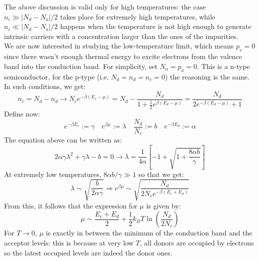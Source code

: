 \documentclass[10.75pt,a4paper,openright,bottom=2cm]{article}
\begin{document}
The above discussion is valid only for high temperatures: the case $n_i\gg|N_d-N_a|/2$ takes place for extremely high temperatures, while $n_i\ll|N_d-N_a|/2$ happens when the temperature is not high enough to generate intrinsic carriers with a concentration larger than the ones of the impurities.\\
We are now interested in studying the low-temperature limit, which means $p_v=0$ since there wasn't enough thermal energy to excite electrons from the valence band into the conduction band. For simplicity, set $N_a=p_a=0$. This is a n-type semiconductor, for the p-type (i.e. $N_d=n_d=n_c=0$) the reasoning is the same. In such conditions, we get:
\[
n_c=N_d-n_d\to N_ce^{-\beta(E_c-\mu)}=N_d-\frac{N_d}{1+\frac{1}{2}e^{\beta(E_d-\mu)}}=\frac{N_d}{2e^{-\beta(E_d-\mu)}+1}
\]
Define now:
\[
e^{-\beta E_c}:=\gamma \quad e^{\beta\mu}:=\lambda \quad \frac{N_d}{N_c}:=b \quad e^{-\beta E_d}:=\alpha
\]
The equation above can be written as:
\[
2\alpha\gamma\lambda^2+\gamma\lambda-b=0\to\lambda=\frac{1}{4\alpha}\left[-1+\sqrt{1+\frac{8\alpha b}{\gamma}}\right]
\]
At extremely low temperatures, $8\alpha b/\gamma\gg1$ so that we get:
\[
\lambda\sim\sqrt{\frac{b}{2\alpha\gamma}}\Rightarrow e^{\beta\mu}\sim\sqrt{\frac{N_d}{2N_ce^{-\beta(E_c+E_d)}}}
\]
From this, it follows that the expression for $\mu$ is given by:
\[
\mu\sim\frac{E_c+E_d}{2}+\frac{1}{2}k_BT\ln\left(\frac{N_d}{2N_c}\right)
\]
For $T\to0$, $\mu$ is exactly in between the minimum of the conduction band and the acceptor levels: this is because at very low $T$, all donors are occupied by electrons so the latest occupied levels are indeed the donor ones.
\end{document}
